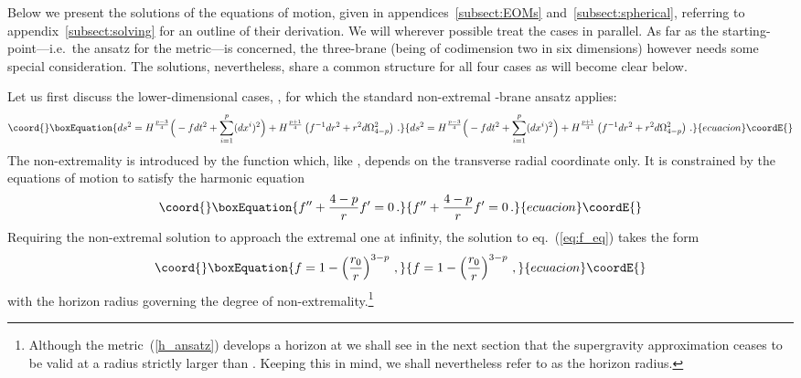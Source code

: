 \documentclass[a4paper,11pt]{article}
\providecommand{\eqref}[1]{(\ref{#1})}
\begin{document}
Below we present the solutions of the equations of motion, given in
appendices~\ref{subsect:EOMs} and~\ref{subsect:spherical}, referring
to appendix~\ref{subsect:solving} for an outline of their derivation.
We will wherever possible treat the cases \coordHE{} in parallel. As
far as the starting-point---i.e.\ the ansatz for the metric---is
concerned, the three-brane (being of codimension two in six dimensions)
however needs some special consideration. The solutions, nevertheless,
share a common structure for all four cases as will become clear below.

Let us first discuss the lower-dimensional cases, \coordHE{}, for which
the standard non-extremal \coordHE{}-brane ansatz applies:
%
\begin{equation}\coord{}\boxEquation{
\label{h_ansatz}
ds^2 = H^{\frac{p-3}{4}} \Big( - f dt^2 + \sum_{i=1}^p (dx^i)^2 \Big)
 + H^{\frac{p+1}{4}} \left( f^{-1}dr^2 + r^2 d\Omega_{4-p}^2 \right)\,.
}{
ds^2 = H^{\frac{p-3}{4}} \Big( - f dt^2 + \sum_{i=1}^p (dx^i)^2 \Big)
 + H^{\frac{p+1}{4}} \left( f^{-1}dr^2 + r^2 d\Omega_{4-p}^2 \right)\,.
}{ecuacion}\coordE{}\end{equation}
%
The non-extremality is introduced by the function \coordHE{} which, like \coordHE{},
depends on the transverse radial coordinate only. It is constrained by
the equations of motion to satisfy the harmonic equation
%
\begin{equation}\coord{}\boxEquation{
\label{eq:f_eq}
f'' + \frac{4-p}{r}f' = 0 \,.
}{
f'' + \frac{4-p}{r}f' = 0 \,.
}{ecuacion}\coordE{}\end{equation}
%
Requiring the non-extremal solution to approach the extremal one at
infinity, the solution to eq.~\eqref{eq:f_eq} takes the form
%
\begin{equation}\coord{}\boxEquation{
\label{f_ansatz}
f = 1 - \left(\frac{r_0}{r}\right)^{3-p} \,,
}{
f = 1 - \left(\frac{r_0}{r}\right)^{3-p} \,,
}{ecuacion}\coordE{}\end{equation}
with the horizon radius \coordHE{} governing the degree of
non-extremality.\footnote{Although the metric~\eqref{h_ansatz}
develops a horizon at \coordHE{} we shall see in the next section that the
supergravity approximation ceases to be valid at a radius \coordHE{}
strictly larger than \coordHE{}. Keeping this in mind, we shall
nevertheless refer to \coordHE{} as the horizon radius.}
\end{document}
